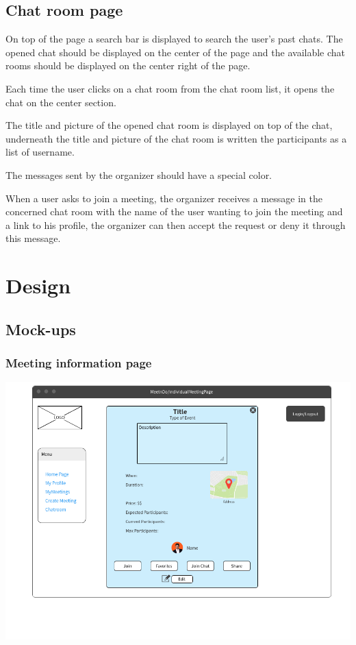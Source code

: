 \documentclass[conference]{IEEEtran}
\begin{document}
\subsection{Chat room page}

On top of the page a search bar is displayed to search the user's past chats.
The opened chat should be displayed on the center of the page and the available chat rooms should be displayed on the center right of the page.

Each time the user clicks on a chat room from the chat room list, it opens the chat on the center section.

The title and picture of the opened chat room is displayed on top of the chat, underneath the title and picture of the chat room is written the participants as a list of username.

The messages sent by the organizer should have a special color.

When a user asks to join a meeting, the organizer receives a message in the concerned chat room with the name of the user wanting to join the meeting and a link to his profile, the organizer can then accept the request or deny it through this message.

\section{Design}

\subsection{Mock-ups}

\subsubsection{Meeting information page}

\includegraphics[scale=0.3]{mockups/IndivMeeting}
\end{document}
